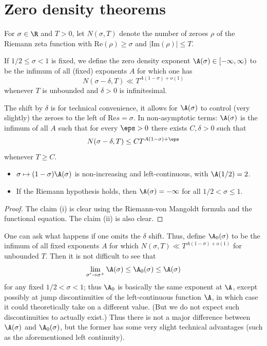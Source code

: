 \chapter{Zero density theorems}\label{zero-density-chapter}

\begin{definition}\label{zero-def}  For $\sigma \in \R$ and $T>0$, let $N(\sigma,T)$ denote the number of zeroes $\rho$ of the Riemann zeta function with $\mathrm{Re}(\rho) \geq \sigma$ and $|\mathrm{Im}(\rho)| \leq T$.

If $1/2 \leq \sigma < 1$ is fixed, we define the zero density exponent $\A(\sigma) \in [-\infty,\infty)$ to be the infimum of all (fixed) exponents $A$ for which one has
    $$ N(\sigma-\delta,T) \ll T^{A (1-\sigma)+o(1)}$$
whenever $T$ is unbounded and $\delta>0$ is infinitesimal.
\end{definition}

The shift by $\delta$ is for technical convenience, it allows for $\A(\sigma)$ to control (very slightly) the zeroes to the left of $\mathrm{Re} s = \sigma$.  In non-asymptotic terms: $\A(\sigma)$ is the infimum of all $A$ such that for every $\eps>0$ there exists $C, \delta > 0$ such that
$$ N(\sigma-\delta, T) \leq C T^{A(1-\sigma)+\eps}$$
whenever $T \geq C$.

\begin{lemma}\label{zero-basic}
\begin{itemize}
\item[(i)] $\sigma \mapsto (1-\sigma) \A(\sigma)$ is non-increasing and left-continuous, with $\A(1/2)=2$.
\item[(ii)] If the Riemann hypothesis holds, then $\A(\sigma)=-\infty$ for all $1/2 < \sigma \leq 1$.
\end{itemize}
\end{lemma}

\begin{proof} The claim (i) is clear using the Riemann-von Mangoldt formula \cite[Theorem 1.7]{ivic} and the functional equation.  The claim (ii) is also clear.
\end{proof}

\begin{remark} One can ask what happens if one omits the $\delta$ shift.  Thus, define $\A_0(\sigma)$ to be the infimum of all fixed exponents $A$ for which  $N(\sigma,T) \ll T^{A (1-\sigma)+o(1)}$ for unbounded $T$. Then it is not difficult to see that
$$ \lim_{\sigma' \to \sigma^+} \A(\sigma) \leq \A_0(\sigma) \leq \A(\sigma)$$
for any fixed $1/2 < \sigma < 1$; thus $\A_0$ is basically the same exponent at $\A$, except possibly at jump discontinuities of the left-continuous function $\A$, in which case it could theoretically take on a different value.  (But we do not expect such discontinuities to actually exist.)  Thus there is not a major difference between $\A(\sigma)$ and $\A_0(\sigma)$, but the former has some very slight technical advantages (such as the aforementioned left continuity).
\end{remark}

